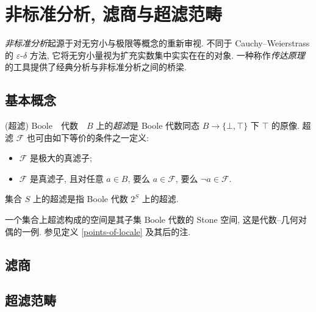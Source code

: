 \section{非标准分析, 滤商与超滤范畴}

\emph{非标准分析}起源于对无穷小与极限等概念的重新审视. 不同于 Cauchy--Weierstrass 的 $\varepsilon$-$\delta$ 方法, 它将无穷小量视为扩充实数集中实实在在的对象. 一种称作\emph{传达原理}的工具提供了经典分析与非标准分析之间的桥梁.

\subsection{基本概念}

\begin{definition}
	{(超滤)}
	Boole　代数　$B$ 上的\emph{超滤}是 Boole 代数同态 $B\to \{\bot,\top\}$ 下 $\top$ 的原像. 超滤 $\mathcal F$ 也可由如下等价的条件之一定义:
	\begin{itemize}
		\item $\mathcal F$ 是极大的真滤子;
		\item $\mathcal F$ 是真滤子, 且对任意 $a\in B$, 要么 $a\in\mathcal F$, 要么 $\neg a\in \mathcal F$.
	\end{itemize}
	集合 $S$ 上的超滤是指 Boole 代数 $2^S$ 上的超滤.
\end{definition}

\begin{remark}
	{}
	一个集合上超滤构成的空间是其子集 Boole 代数的 Stone 空间, 这是代数--几何对偶的一例. 参见定义 \ref{points-of-locale} 及其后的注.
\end{remark}

\subsection{滤商}

\subsection{超滤范畴}